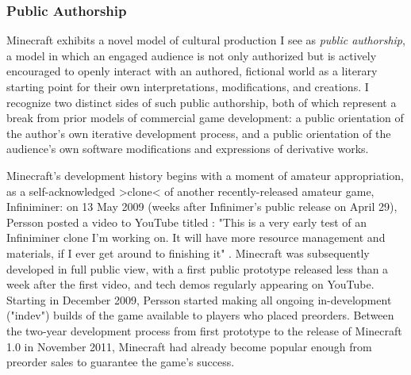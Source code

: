 \subsubsection*{Public Authorship}
Minecraft exhibits a novel model of cultural production I see as \emph{public authorship}, a model in which an engaged audience is not only authorized but is actively encouraged to openly interact with an authored, fictional world as a literary starting point for their own interpretations, modifications, and creations. I recognize two distinct sides of such public authorship, both of which represent a break from prior models of commercial game development: a public orientation of the author's own iterative development process, and a public orientation of the audience's own software modifications and expressions of derivative works.

Minecraft's development history begins with a moment of amateur appropriation, as a self-acknowledged >clone< of another recently-released amateur game, Infiniminer: on 13 May 2009 (weeks after Infinimer's public release on April 29), Persson posted a video to YouTube titled : "This is a very early test of an Infiniminer clone I'm working on. It will have more resource management and materials, if I ever get around to finishing it" \autocite{Persson-cave}. Minecraft was subsequently developed in full public view, with a first public prototype released less than a week after the first video, and tech demos regularly appearing on YouTube. Starting in December 2009, Persson started making all ongoing in-development ("indev") builds of the game available to players who placed preorders. Between the two-year development process from first prototype to the release of Minecraft 1.0 in November 2011, Minecraft had already become popular enough from preorder sales to guarantee the game's success.

